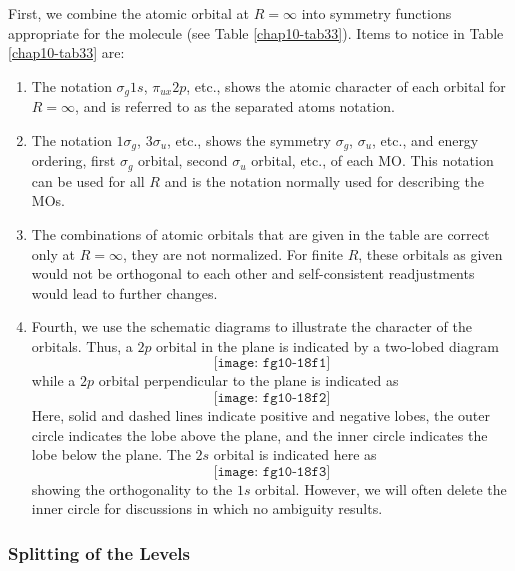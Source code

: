 First, we combine the atomic orbital at $R = \infty$ into symmetry
functions appropriate for the molecule (see Table \ref{chap10-tab33}).
Items to notice in Table \ref{chap10-tab33} are:
\begin{enumerate}
\item The notation $\sigma_g 1s$, $\pi_{ux}2p$, etc., shows the atomic
character of each orbital for $R = \infty$, and is referred to as the
separated atoms notation.  
\item The notation $1 \sigma_g$, $3 \sigma_u$, etc.,
shows the symmetry $\sigma_g$, $\sigma_u$, etc., and energy ordering,
first $\sigma_g$ orbital, second $\sigma_u$ orbital, etc., of each
MO.  This notation can be used for all $R$ and is the
notation normally used for describing the MOs.
\item The combinations of atomic orbitals that are given in the table are 
correct only at $R = \infty$, they are not normalized.  For finite
$R$, these orbitals as given would not be orthogonal to each other and
self-consistent readjustments would lead to further changes.
\item Fourth, we use the 
schematic diagrams to illustrate the character of the orbitals. Thus, 
a $2p$ orbital in the plane is indicated by a two-lobed diagram
\begin{equation}
\texttt{[image: fg10-18f1]}
\end{equation}
while a $2p$ orbital perpendicular to the plane is indicated as
\begin{equation}
\texttt{[image: fg10-18f2]}
\end{equation}
Here, solid and dashed lines indicate positive and negative 
lobes, the outer circle indicates the lobe above the plane, and 
the inner circle indicates the lobe below the plane.  The $2s$ 
orbital is indicated here as
\begin{equation}
\texttt{[image: fg10-18f3]}
\end{equation}
showing the orthogonality to the $1s$ orbital.  However, we will 
often delete the inner circle for discussions in which no ambiguity
results.
\end{enumerate}

\subsubsection{Splitting of the Levels}


